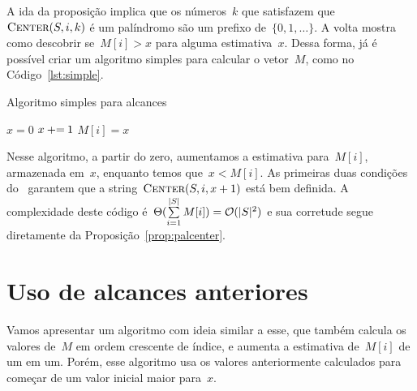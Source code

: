 A ida da proposição implica que os números~$k$ que satisfazem que~$\textsc{Center}(S, i, k)$ é um palíndromo são um prefixo de~${\{0, 1, \ldots\}}$. A volta mostra como descobrir se~$M[i] > x$ para alguma estimativa~$x$. Dessa forma, já é possível criar um algoritmo simples para calcular o vetor~$M$, como no Código~\ref{lst:simple}.

\begin{algorithm}[H]
\caption{Algoritmo simples para alcances} \label{lst:simple}
\begin{algorithmic}[1]
    \State $x = 0$
        \State $x \mathbin{{\tiny +}{=}} 1$
    \EndWhile
    \State $M[i] = x$
\EndFor
\end{algorithmic}
\end{algorithm}

Nesse algoritmo, a partir do zero, aumentamos a estimativa para~$M[i]$, armazenada em~$x$, enquanto temos que~$x < M[i]$. As primeiras duas condições do~ garantem que a string~$\textsc{Center}(S, i, x + 1)$ está bem definida. A complexidade deste código é~${\Theta(\sum\limits_{i=1}^{|S|}{M[i]}) = \mathcal{O}(|S|^2)}$ e sua corretude segue diretamente da Proposição~\ref{prop:palcenter}.

\section{Uso de alcances anteriores}

Vamos apresentar um algoritmo com ideia similar a esse, que também calcula os valores de~$M$ em ordem crescente de índice, e aumenta a estimativa de~$M[i]$ de um em um. Porém, esse algoritmo usa os valores anteriormente calculados para começar de um valor inicial maior para~$x$.

